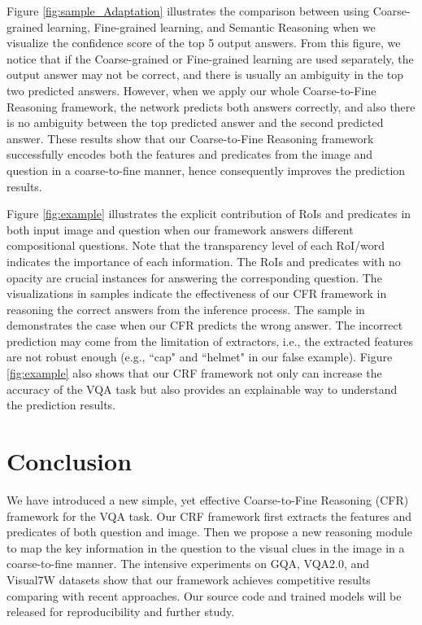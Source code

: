 \documentclass[10pt,twocolumn,letterpaper]{article}
\begin{document}
Figure \ref{fig:sample_Adaptation} illustrates the comparison between using Coarse-grained learning, Fine-grained learning, and Semantic Reasoning when we visualize the confidence score of the top 5 output answers. From this figure, we notice that if the Coarse-grained or Fine-grained learning are used separately, the output answer may not be correct, and there is usually an ambiguity in the top two predicted answers. However, when we apply our whole Coarse-to-Fine Reasoning framework, the network predicts both answers correctly, and also there is no ambiguity between the top predicted answer and the second predicted answer. These results show that our Coarse-to-Fine Reasoning framework successfully encodes both the features and predicates from the image and question in a coarse-to-fine manner, hence consequently improves the prediction results.


Figure \ref{fig:example} illustrates the explicit contribution of RoIs and predicates in both input image and question when our framework answers different compositional questions. Note that the transparency level of each RoI/word indicates the importance of each information. The RoIs and predicates with no opacity are crucial instances for answering the corresponding question. The visualizations in samples  indicate the effectiveness of our CFR framework in reasoning the correct answers from the inference process. The sample in  demonstrates the case when our CFR predicts the wrong answer. The incorrect prediction may come from the limitation of extractors, i.e., the extracted features are not robust enough (e.g., ``cap" and ``helmet" in our false example). Figure \ref{fig:example} also shows that our CRF framework not only can increase the accuracy of the VQA task but also provides an explainable way to understand the prediction results.








\section{Conclusion}
\label{sec:con}
We have introduced a new simple, yet effective Coarse-to-Fine Reasoning (CFR) framework for the VQA task. Our CRF framework first extracts the features and predicates of both question and image. Then we propose a new reasoning module to map the key information in the question to the visual clues in the image in a coarse-to-fine manner. The intensive experiments on GQA, VQA2.0, and Visual7W datasets show that our framework achieves competitive results comparing with recent approaches. Our source code and trained models will be released for reproducibility and further study.

{\small


}
\end{document}
